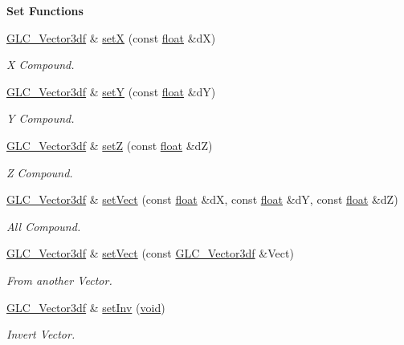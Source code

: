 \begin{Indent}{\bf Set Functions}\par
\begin{DoxyCompactItemize}
\item 
\hyperlink{class_g_l_c___vector3df}{G\-L\-C\-\_\-\-Vector3df} \& \hyperlink{class_g_l_c___vector3df_a4c5c80d9c30c13bd211925c88576ce4e}{set\-X} (const \hyperlink{_super_l_u_support_8h_a6a1bb6ed41f44b60e7bd83b0e9945aa7}{float} \&d\-X)
\begin{DoxyCompactList}\small\item\em X Compound. \end{DoxyCompactList}\item 
\hyperlink{class_g_l_c___vector3df}{G\-L\-C\-\_\-\-Vector3df} \& \hyperlink{class_g_l_c___vector3df_a627572d0213cf932ac99cf0e90295fea}{set\-Y} (const \hyperlink{_super_l_u_support_8h_a6a1bb6ed41f44b60e7bd83b0e9945aa7}{float} \&d\-Y)
\begin{DoxyCompactList}\small\item\em Y Compound. \end{DoxyCompactList}\item 
\hyperlink{class_g_l_c___vector3df}{G\-L\-C\-\_\-\-Vector3df} \& \hyperlink{class_g_l_c___vector3df_a0c95136b769cc9c3ba8d3eb3cb80129c}{set\-Z} (const \hyperlink{_super_l_u_support_8h_a6a1bb6ed41f44b60e7bd83b0e9945aa7}{float} \&d\-Z)
\begin{DoxyCompactList}\small\item\em Z Compound. \end{DoxyCompactList}\item 
\hyperlink{class_g_l_c___vector3df}{G\-L\-C\-\_\-\-Vector3df} \& \hyperlink{class_g_l_c___vector3df_ac1c2b91412ff04a7aa3d08e51c4d0869}{set\-Vect} (const \hyperlink{_super_l_u_support_8h_a6a1bb6ed41f44b60e7bd83b0e9945aa7}{float} \&d\-X, const \hyperlink{_super_l_u_support_8h_a6a1bb6ed41f44b60e7bd83b0e9945aa7}{float} \&d\-Y, const \hyperlink{_super_l_u_support_8h_a6a1bb6ed41f44b60e7bd83b0e9945aa7}{float} \&d\-Z)
\begin{DoxyCompactList}\small\item\em All Compound. \end{DoxyCompactList}\item 
\hyperlink{class_g_l_c___vector3df}{G\-L\-C\-\_\-\-Vector3df} \& \hyperlink{class_g_l_c___vector3df_a356d0c54bb0acf28591899958a759ab8}{set\-Vect} (const \hyperlink{class_g_l_c___vector3df}{G\-L\-C\-\_\-\-Vector3df} \&Vect)
\begin{DoxyCompactList}\small\item\em From another Vector. \end{DoxyCompactList}\item 
\hyperlink{class_g_l_c___vector3df}{G\-L\-C\-\_\-\-Vector3df} \& \hyperlink{class_g_l_c___vector3df_af9337bbeecf0fb0dd760ff6905c6aee2}{set\-Inv} (\hyperlink{group___u_a_v_objects_plugin_ga444cf2ff3f0ecbe028adce838d373f5c}{void})
\begin{DoxyCompactList}\small\item\em Invert Vector. \end{DoxyCompactList}\end{DoxyCompactItemize}
\end{Indent}
